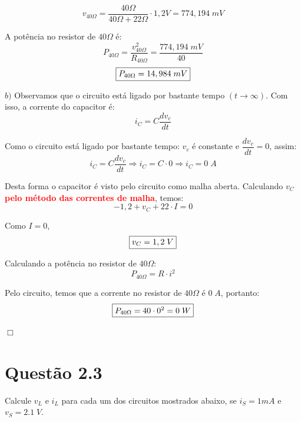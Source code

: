 \documentclass[
	12pt,				%
	oneside,			%
	a4paper,			%
	english,			%
	french,				%
	spanish,			%
	brazil				%
	]{abntex2}
\begin{document}
$$v_{40\Omega} = \dfrac{40\Omega}{40\Omega + 22\Omega} \cdot 1,2V = 774,194 \;mV$$

A potência no resistor de $40\Omega$ é:
$$P_{40\Omega} = \dfrac{v_{40\Omega}^2}{R_{40\Omega}} = \dfrac{774,194\;mV}{40}$$
\begin{equation}
    \centering
    \fbox{$P_{40\Omega} = 14,984\;mV$}
\end{equation}

\newpage
$b)$ Observamos que o circuito está ligado por bastante tempo $(t\rightarrow \infty)$. Com isso, a corrente do capacitor é:
$$i_C = C\dfrac{d v_c}{dt}$$

Como o circuito está ligado por bastante tempo: $v_c$ é constante e $\dfrac{d v_c}{dt} = 0$, assim:
$$i_C = C\dfrac{d v_c}{dt} \Longrightarrow i_C = C \cdot 0 \Longrightarrow i_C=0\;A$$

Desta forma o capacitor é visto pelo circuito como malha aberta. Calculando $v_C$ \textbf{\textcolor{red}{pelo método das correntes de malha}}, temos:
$$-1,2 + v_C + 22\cdot I = 0$$

Como $I=0$,
\begin{equation}
    \centering
    \fbox{$v_C=1,2\;V$}
\end{equation}

Calculando a potência no resistor de $40\Omega$:
$$P_{40\Omega} = R\cdot i^2$$

Pelo circuito, temos que a corrente no resistor de $40\Omega$ é $0\;A$, portanto:
\begin{equation}
    \centering
    \fbox{$P_{40\Omega} = 40\cdot 0^2 = 0\;W$}
\end{equation}

\begin{flushright}
    $\Box$
\end{flushright}
\newpage
\section*{Questão 2.3}
Calcule $v_L$ e $i_L$ para cada um dos circuitos mostrados abaixo, se $i_S = 1mA$ e $v_S = 2.1\;V$.
\end{document}
